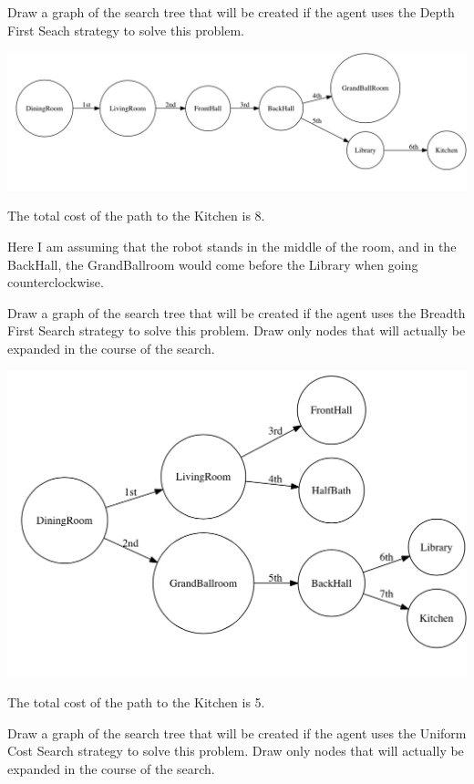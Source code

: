 \documentclass[12pt]{article}
\newenvironment{questionList}{
\newcounter{ctr}
\begin{list}{\textbf{Question \arabic{ctr}.} \\ \\ }
  {\usecounter{ctr}}
  }{
\end{list}
}
\begin{document}
\begin{questionList}
\item
Draw a graph of the search tree that will be created if the agent uses the
Depth First Seach strategy to solve this problem.  

\includegraphics[scale=.5]{./images/DFS.png}

The total cost of the path to the Kitchen is 8. 

Here I am assuming that the robot stands in the middle of the room, and in the BackHall, the GrandBallroom would come before the Library when going counterclockwise.

\item
Draw a graph of the search tree that will be created if the agent uses the
Breadth First Search strategy to solve this problem.  Draw only nodes that will
actually be expanded in the course of the search.

\includegraphics[scale=.5]{./images/BFS.png}

The total cost of the path to the Kitchen is 5. 


\item
Draw a graph of the search tree that will be created if the agent uses the
Uniform Cost Search strategy to solve this problem.  Draw only nodes that will
actually be expanded in the course of the search.


\end{questionList}
\end{document}
